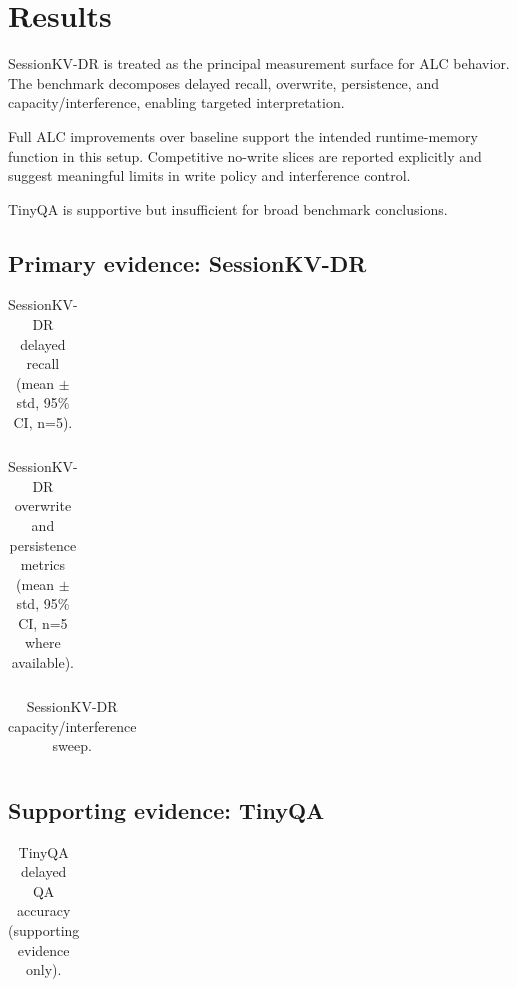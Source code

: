 \section{Results}
SessionKV-DR is treated as the principal measurement surface for ALC behavior. The benchmark decomposes delayed recall, overwrite, persistence, and capacity/interference, enabling targeted interpretation.

Full ALC improvements over baseline support the intended runtime-memory function in this setup. Competitive no-write slices are reported explicitly and suggest meaningful limits in write policy and interference control.

TinyQA is supportive but insufficient for broad benchmark conclusions.

\subsection{Primary evidence: SessionKV-DR}
\begin{table}[h]
\centering
\begin{tabular}{llll}
\toprule

\bottomrule
\end{tabular}
\caption{SessionKV-DR delayed recall (mean $\pm$ std, 95\% CI, n=5).}
\end{table}

\begin{table}[h]
\centering
\begin{tabular}{llll}
\toprule

\bottomrule
\end{tabular}
\caption{SessionKV-DR overwrite and persistence metrics (mean $\pm$ std, 95\% CI, n=5 where available).}
\end{table}

\begin{table}[h]
\centering
\begin{tabular}{llll}
\toprule

\bottomrule
\end{tabular}
\caption{SessionKV-DR capacity/interference sweep.}
\end{table}

\subsection{Supporting evidence: TinyQA}
\begin{table}[h]
\centering
\begin{tabular}{llll}
\toprule

\bottomrule
\end{tabular}
\caption{TinyQA delayed QA accuracy (supporting evidence only).}
\end{table}

